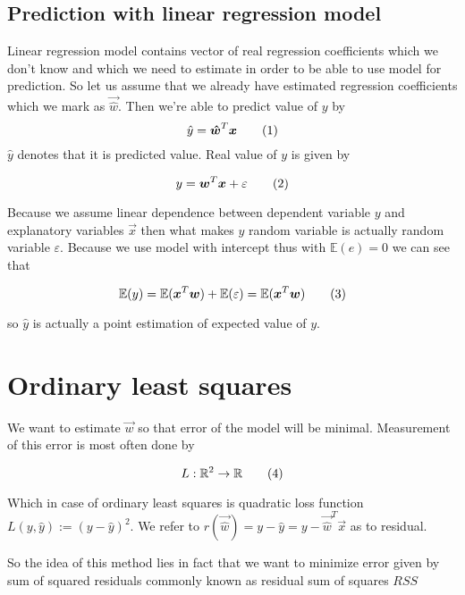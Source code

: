 \subsection{Prediction with linear regression model}
Linear regression model contains vector of real regression coefficients which we don't know and which we need to estimate in order to be able to use model for prediction. So let us assume that we already have estimated regression coefficients which we mark as $\vec{\hat{w}}$. Then we're able to predict value of $y$ by
\begin{equation}
    \hat{y} = \vec{\hat{w}}^T\vec{x} \numberthis
\end{equation}
$\hat{y}$ denotes that it is predicted value. Real value of $y$ is given by 

\begin{equation}
    y = \vec{w}^T\vec{x} + \varepsilon \numberthis
\end{equation}

Because we assume linear dependence between dependent variable $y$ and explanatory variables $\vec{x}$ then what makes $y$ random variable is actually random variable $\varepsilon$. Because we use model with intercept thus with $\mathbb{E}(e) = 0$ we can see that 

\begin{equation}
\mathbb{E}(y) =\mathbb{E}(\vec{x}^T\vec{w}) + \mathbb{E}(\varepsilon) = \mathbb{E}(\vec{x}^T\vec{w})
\numberthis
\end{equation}

so $\hat{y}$ is actually a point estimation of expected value of $y$.


\section{Ordinary least squares}
We want to estimate $\vec{w}$ so that error of the model will be minimal. Measurement of this error is most often done by  

\begin{equation}
L : \mathbb{R}^2 \rightarrow  \mathbb{R} \numberthis
\end{equation}

Which in case of ordinary least squares is quadratic loss function $L(y, \hat{y}) := (y - \hat{y})^2$. We refer to $r(\vec{\hat{w}}) = y - \hat{y} = y - \vec{\hat{w}}^T\vec{x} $ as to residual. 

So the idea of this method lies in fact that we want to minimize error given by sum of squared residuals commonly known as residual sum of squares $RSS$

